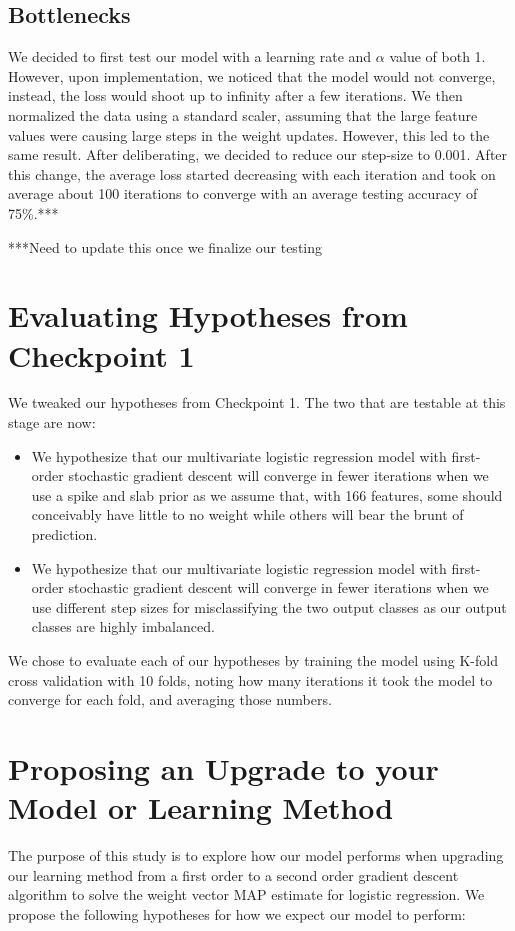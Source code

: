 \documentclass[12pt]{article}
\begin{document}
\subsection{Bottlenecks}

We decided to first test our model with a learning rate and $\alpha$ value of both 1. However, upon implementation, we noticed that the model would not converge, instead, the loss would shoot up to infinity after a few iterations. We then normalized the data using a standard scaler, assuming that the large feature values were causing large steps in the weight updates. However, this led to the same result. After deliberating, we decided to reduce our step-size to 0.001. After this change, the average loss started decreasing with each iteration and took on average about 100 iterations to converge with an average testing accuracy of 75\%.***

***Need to update this once we finalize our testing


\section{Evaluating Hypotheses from Checkpoint 1}

We tweaked our hypotheses from Checkpoint 1. The two that are testable at this stage are now:
\begin{itemize}
    \item We hypothesize that our multivariate logistic regression model with first-order stochastic gradient descent will converge in fewer iterations when we use a spike and slab prior as we assume that, with 166 features, some should conceivably have little to no weight while others will bear the brunt of prediction.
\end{itemize}

\begin{itemize}
    \item We hypothesize that our multivariate logistic regression model with first-order stochastic gradient descent will converge in fewer iterations when we use different step sizes for misclassifying the two output classes as our output classes are highly imbalanced.
\end{itemize}

We chose to evaluate each of our hypotheses by training the model using K-fold cross validation with 10 folds, noting how many iterations it took the model to converge for each fold, and averaging those numbers. 

\section{Proposing an Upgrade to your Model or Learning Method}

The purpose of this study is to explore how our model performs when upgrading our
learning method from a first order to a second order gradient descent algorithm to solve the
weight vector MAP estimate for logistic regression. We propose the following hypotheses
for how we expect our model to perform:
\end{document}
